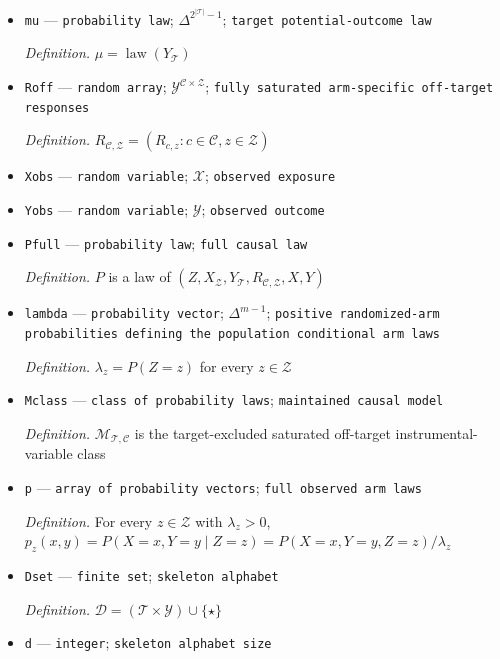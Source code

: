 \documentclass{article}
\begin{document}
\begin{itemize}
  \item \texttt{mu} --- \texttt{probability law}; \(\Delta^{2^{|\mathcal T|}-1}\); \texttt{target potential-\allowbreak{}outcome law}
  \par\smallskip\noindent\emph{Definition.} \(\mu=\operatorname{law}(Y_{\mathcal T})\)
  \item \texttt{Roff} --- \texttt{random array}; \(\mathcal Y^{\mathcal C\times\mathcal Z}\); \texttt{fully saturated arm-\allowbreak{}specific off-\allowbreak{}target responses}
  \par\smallskip\noindent\emph{Definition.} \(R_{\mathcal C,\mathcal Z}=(R_{c,z}:c\in\mathcal C,z\in\mathcal Z)\)
  \item \texttt{Xobs} --- \texttt{random variable}; \(\mathcal X\); \texttt{observed exposure}
  \item \texttt{Yobs} --- \texttt{random variable}; \(\mathcal Y\); \texttt{observed outcome}
  \item \texttt{Pfull} --- \texttt{probability law}; \texttt{full causal law}
  \par\smallskip\noindent\emph{Definition.} \(P\) is a law of \((Z,X_{\mathcal Z},Y_{\mathcal T},R_{\mathcal C,\mathcal Z},X,Y)\)
  \item \texttt{lambda} --- \texttt{probability vector}; \(\Delta^{m-1}\); \texttt{positive randomized-\allowbreak{}arm probabilities defining the population conditional arm laws}
  \par\smallskip\noindent\emph{Definition.} \(\lambda_z=P(Z=z)\) for every \(z\in\mathcal Z\)
  \item \texttt{Mclass} --- \texttt{class of probability laws}; \texttt{maintained causal model}
  \par\smallskip\noindent\emph{Definition.} \(\mathcal M_{\mathcal T,\mathcal C}\) is the target-excluded saturated off-target instrumental-variable class
  \item \texttt{p} --- \texttt{array of probability vectors}; \texttt{full observed arm laws}
  \par\smallskip\noindent\emph{Definition.} For every \(z\in\mathcal Z\) with \(\lambda_z>0\), \(p_z(x,y)=P(X=x,Y=y\mid Z=z)=P(X=x,Y=y,Z=z)/\lambda_z\)
  \item \texttt{Dset} --- \texttt{finite set}; \texttt{skeleton alphabet}
  \par\smallskip\noindent\emph{Definition.} \(\mathcal D=(\mathcal T\times\mathcal Y)\cup\{\star\}\)
  \item \texttt{d} --- \texttt{integer}; \texttt{skeleton alphabet size}

\end{itemize}
\end{document}
